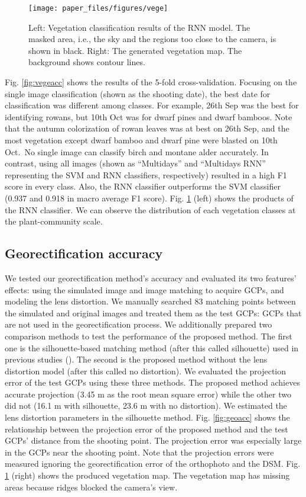 \documentclass{article}
\begin{document}
\begin{figure}
\texttt{[image: paper\_files/figures/vege]} \caption{Left: Vegetation classification results of the RNN model. The masked area, i.e., the sky and the regions too close to the camera, is shown in black. Right: The generated vegetation map. The background shows contour lines.}\label{fig:vegetation}
\end{figure}

Fig. \ref{fig:vegeacc} shows the results of the 5-fold cross-validation. Focusing on the single image classification (shown as the shooting date), the best date for classification was different among classes. For example, 26th Sep was the best for identifying rowans, but 10th Oct was for dwarf pines and dwarf bamboos. Note that the autumn colorization of rowan leaves was at best on 26th Sep, and the most vegetation except dwarf bamboo and dwarf pine were blasted on 10th Oct.~No single image can classify birch and montane alder accurately. In contrast, using all images (shown as ``Multidays'' and ``Multidays RNN'' representing the SVM and RNN classifiers, respectively) resulted in a high F1 score in every class. Also, the RNN classifier outperforms the SVM classifier (0.937 and 0.918 in macro average F1 score). Fig. \ref{fig:vegetation} (left) shows the products of the RNN classifier. We can observe the distribution of each vegetation classes at the plant-community scale.

\hypertarget{georectification-accuracy}{%
\subsection{Georectification accuracy}\label{georectification-accuracy}}

We tested our georectification method's accuracy and evaluated its two features' effects: using the simulated image and image matching to acquire GCPs, and modeling the lens distortion. We manually searched 83 matching points between the simulated and original images and treated them as the test GCPs: GCPs that are not used in the georectification process. We additionally prepared two comparison methods to test the performance of the proposed method. The first one is the silhouette-based matching method (after this called silhouette) used in previous studies (\cite{Portenier2020Cryosphere}). The second is the proposed method without the lens distortion model (after this called no distortion). We evaluated the projection error of the test GCPs using these three methods. The proposed method achieves accurate projection (3.45 m as the root mean square error) while the other two did not (16.1 m with silhouette, 23.6 m with no distortion). We estimated the lens distortion parameters in the silhouette method. Fig. \ref{fig:geoacc} shows the relationship between the projection error of the proposed method and the test GCPs' distance from the shooting point. The projection error was especially large in the GCPs near the shooting point. Note that the projection errors were measured ignoring the georectification error of the orthophoto and the DSM. Fig. \ref{fig:vegetation} (right) shows the produced vegetation map. The vegetation map has missing areas because ridges blocked the camera's view.
\end{document}

